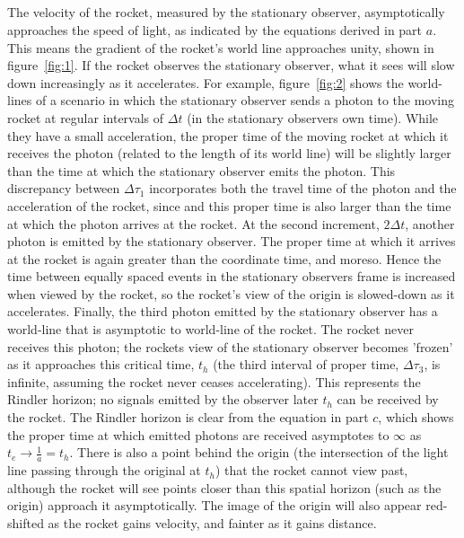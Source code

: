 \documentclass[a4paper]{article}
\begin{document}
\subsection{}
The velocity of the rocket, measured by the stationary observer, asymptotically approaches the speed of light, as indicated by the equations derived in part $a$. 
This means the gradient of the rocket's world line approaches unity, shown in figure~\ref{fig:1}. 
If the rocket observes the stationary observer, what it sees will slow down increasingly as it accelerates.
For example, figure~\ref{fig:2} shows the world-lines of a scenario in which the stationary observer sends a photon to the moving rocket at regular intervals of $\Delta t$ (in the stationary observers own time).
While they have a small acceleration, the proper time of the moving rocket at which it receives the photon (related to the length of its world line) will be slightly larger than the time at which the stationary observer emits the photon. This discrepancy between $\Delta \tau_1$ incorporates both the travel time of the photon and the acceleration of the rocket, since and this proper time is also larger than the time at which the photon arrives at the rocket.
At the second increment, $2\Delta t$, another photon is emitted by the stationary observer.
The proper time at which it arrives at the rocket is again greater than the coordinate time, and moreso. 
Hence the time between equally spaced events in the stationary observers frame is increased when viewed by the rocket, so the rocket's view of the origin is slowed-down as it accelerates.
Finally, the third photon emitted by the stationary observer has a world-line that is asymptotic to world-line of the rocket. 
The rocket never receives this photon; the rockets view of the stationary observer becomes 'frozen' as it approaches this critical time, $t_h$ (the third interval of proper time, $\Delta \tau_3$, is infinite, assuming the rocket never ceases accelerating).
This represents the Rindler horizon; no signals emitted by the observer later $t_h$ can be received by the rocket.
The Rindler horizon is clear from the equation in part $c$, which shows the proper time at which emitted photons are received asymptotes to $\infty$ as $t_e \to \frac{1}{a} = t_h$.
There is also a point behind the origin (the intersection of the light line passing through the original at $t_h$) that the rocket cannot view past, although the rocket will see points closer than this spatial horizon (such as the origin) approach it asymptotically.
The image of the origin will also appear red-shifted as the rocket gains velocity, and fainter as it gains distance.
\end{document}
